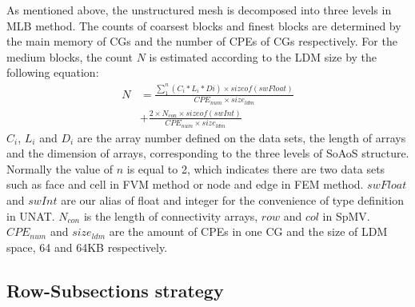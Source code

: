 \documentclass[5p,times]{elsarticle}
\begin{document}
As mentioned above, the unstructured mesh is decomposed into three levels in MLB method. The counts of coarsest blocks and finest blocks are determined by the main memory of CGs and the number of CPEs of CGs respectively. For the medium blocks, the count $N$ is estimated according to the LDM size by the following equation:
\begin{equation}
\begin{aligned}
    N&=\frac{\sum_{1}^{n}(C_{i}*L_{i}*D{i})\times sizeof(swFloat)}{CPE_{num}\times size_{ldm}} \\ 
    &+\frac{2\times N_{con}\times sizeof(swInt)}{CPE_{num}\times size_{ldm}}
\end{aligned}
\end{equation}
$C_{i}$, $L_{i}$ and $D_{i}$ are the array number defined on the data sets, the length of arrays and the dimension of arrays, corresponding to the three levels of SoAoS structure. Normally the value of $n$ is equal to 2, which indicates there are two data sets such as face and cell in FVM method or node and edge in FEM method. $swFloat$ and $swInt$ are our alias of float and integer for the convenience of type definition in UNAT. $N_{con}$ is the length of connectivity arrays, $row$ and $col$ in SpMV. $CPE_{num}$ and $size_{ldm}$ are the amount of CPEs in one CG and the size of LDM space, 64 and 64KB respectively.

\subsection{Row-Subsections strategy}
\end{document}
